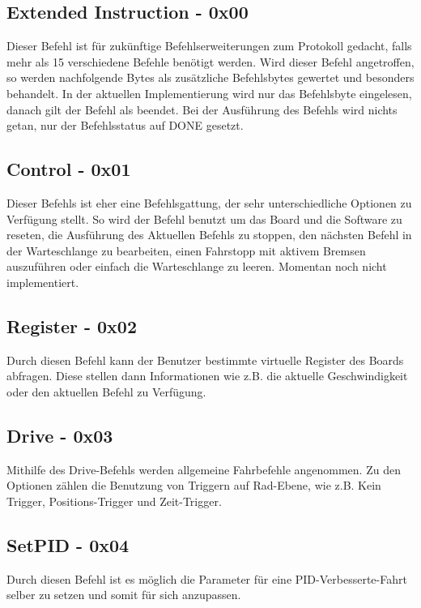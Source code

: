 \documentclass[a4paper]{article}
\begin{document}
	\subsection{Extended Instruction - 0x00}

	Dieser Befehl ist für zukünftige Befehlserweiterungen zum Protokoll gedacht, falls mehr als 15 verschiedene Befehle
	benötigt werden. Wird dieser Befehl angetroffen, so werden nachfolgende Bytes als zusätzliche Befehlsbytes gewertet
	und besonders behandelt.
	In der aktuellen Implementierung wird nur das Befehlsbyte eingelesen, danach gilt der Befehl als beendet. Bei der
	Ausführung des Befehls wird nichts getan, nur der Befehlsstatus auf DONE gesetzt.

	\subsection{Control - 0x01}

	Dieser Befehls ist eher eine Befehlsgattung, der sehr unterschiedliche Optionen zu Verfügung stellt. So wird der
	Befehl benutzt um das Board und die Software zu reseten, die Ausführung des Aktuellen Befehls zu stoppen, den
	nächsten Befehl in der Warteschlange zu bearbeiten, einen Fahrstopp mit aktivem Bremsen auszuführen oder einfach die
	Warteschlange zu leeren.
	Momentan noch nicht implementiert.

	\subsection{Register - 0x02}

	Durch diesen Befehl kann der Benutzer bestimmte virtuelle Register des Boards abfragen. Diese stellen dann Informationen
	wie z.B. die aktuelle Geschwindigkeit oder den aktuellen Befehl zu Verfügung.

	\subsection{Drive - 0x03}

	Mithilfe des Drive-Befehls werden allgemeine Fahrbefehle angenommen. Zu den Optionen zählen die Benutzung von Triggern
	auf Rad-Ebene, wie z.B. Kein Trigger, Positions-Trigger und Zeit-Trigger.

	\subsection{SetPID - 0x04}

	Durch diesen Befehl ist es möglich die Parameter für eine PID-Verbesserte-Fahrt selber zu setzen und somit für sich
	anzupassen.
\end{document}
